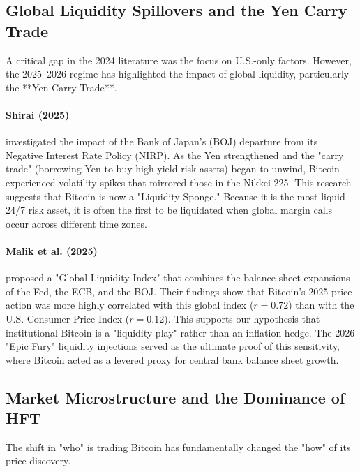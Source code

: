 \documentclass[10pt, conference, compsocconf]{IEEEtran}
\begin{document}
\subsection{Global Liquidity Spillovers and the Yen Carry Trade}

A critical gap in the 2024 literature was the focus on U.S.-only factors. However, the 2025--2026 regime has highlighted the impact of global liquidity, particularly the **Yen Carry Trade**.

\paragraph{Shirai (2025)} investigated the impact of the Bank of Japan’s (BOJ) departure from its Negative Interest Rate Policy (NIRP). As the Yen strengthened and the "carry trade" (borrowing Yen to buy high-yield risk assets) began to unwind, Bitcoin experienced volatility spikes that mirrored those in the Nikkei 225. This research suggests that Bitcoin is now a "Liquidity Sponge." Because it is the most liquid 24/7 risk asset, it is often the first to be liquidated when global margin calls occur across different time zones.

\paragraph{Malik et al. (2025)} proposed a "Global Liquidity Index" that combines the balance sheet expansions of the Fed, the ECB, and the BOJ. Their findings show that Bitcoin's 2025 price action was more highly correlated with this global index ($r=0.72$) than with the U.S. Consumer Price Index ($r=0.12$). This supports our hypothesis that institutional Bitcoin is a "liquidity play" rather than an inflation hedge. The 2026 "Epic Fury" liquidity injections served as the ultimate proof of this sensitivity, where Bitcoin acted as a levered proxy for central bank balance sheet growth.


\subsection{Market Microstructure and the Dominance of HFT}

The shift in "who" is trading Bitcoin has fundamentally changed the "how" of its price discovery.
\end{document}
